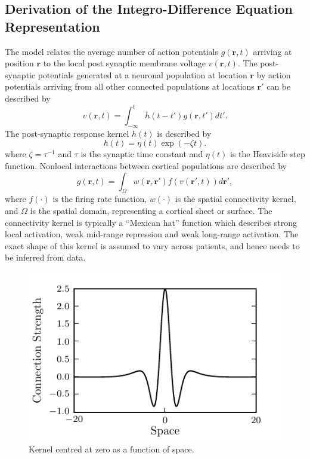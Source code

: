 \documentclass[twocolumn,11pt,a4paper]{article}		%
\begin{document}
\subsection{Derivation of the Integro-Difference Equation Representation}
The model relates the average number of action potentials $g(\mathbf{r},t)$ arriving at position $\mathbf{r}$ to the local post synaptic membrane voltage $v(\mathbf{r},t)$. The post-synaptic potentials generated at a neuronal population at location $\mathbf{r}$ by action potentials arriving from all other connected populations at locations $\mathbf{r}'$ can be described by 
\begin{equation}
	\label{SpikesToPotential} v\left( {\mathbf{r},t} \right) = \int_{ - \infty }^t {h\left( {t - t'} \right)g\left( {\mathbf{r},t'} \right)dt'}. 
\end{equation}
The post-synaptic response kernel $h(t)$ is described by 
\begin{equation}
	\label{SynapticRespKernel} h(t) = \eta(t)\exp{\left(-\zeta t\right)}. 
\end{equation}
where $\zeta=\tau^{-1}$ and $\tau$ is the synaptic time constant and $\eta(t)$ is the Heaviside step function. Nonlocal interactions between cortical populations are described by 
\begin{equation}
	\label{RateBasedInteractions} g\left( \mathbf{r},t \right) = \int_\Omega {w\left( \mathbf{r},\mathbf{r}' \right)f\left( v\left( \mathbf{r}',t \right) \right)d\mathbf{r}'}, 
\end{equation}
where $f(\cdot)$ is the firing rate function, $w(\cdot)$ is the spatial connectivity kernel, and $\Omega$ is the spatial domain, representing a cortical sheet or surface. The connectivity kernel is typically a ``Mexican hat'' function which describes strong local activation, weak mid-range repression and weak long-range activation. The exact shape of this kernel is assumed to vary across patients, and hence needs to be inferred from data.
\begin{figure}[ th]\label{fig:2d_kernel}
   	\begin{center}
   		\includegraphics{./Graph/Cross_section_kernel.pdf} 
   	\end{center}
   	\caption{Kernel centred at zero as a function of space.} 
   \end{figure}
\end{document}
